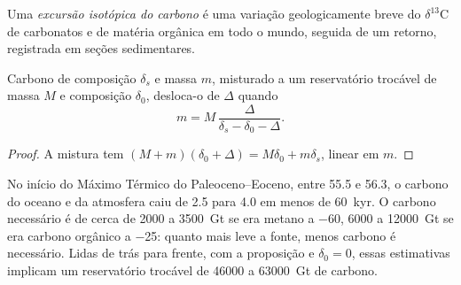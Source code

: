 \begin{definition}\label{def:b3:stable-isotopes:cie}
Uma \emph{excursão isotópica do carbono} é uma
variação geologicamente breve do $\delta^{13}\mathrm C$ de carbonatos e de matéria
orgânica em todo o mundo, seguida de um retorno, registrada em seções sedimentares.
\end{definition}

\begin{proposition}\label{prop:b3:stable-isotopes:cie-mass}
Carbono de composição $\delta_s$ e massa $m$, misturado a um reservatório trocável
de massa $M$ e composição $\delta_0$, desloca-o de $\Delta$ quando
\[
m = M\,\frac{\Delta}{\delta_s - \delta_0 - \Delta}.
\]
\end{proposition}

\begin{proof}
A mistura tem $(M + m)(\delta_0 + \Delta) = M\delta_0 + m\delta_s$, linear em
$m$.
\end{proof}

No início do Máximo Térmico do Paleoceno–Eoceno, entre 55.5 e
\qty{56.3}{\Ma}, o carbono do oceano e da atmosfera caiu de 2.5 para
\qty{4.0}{\permil} em menos de \qty{60}{kyr}. O carbono necessário é de cerca de
2000 a \qty{3500}{Gt} se era metano a \qty{-60}{\permil}, 6000 a
\qty{12000}{Gt} se era carbono orgânico a \qty{-25}{\permil}: quanto mais leve
a fonte, menos carbono é necessário. Lidas de trás para frente, com a proposição
e $\delta_0 = 0$, essas estimativas implicam um reservatório trocável de \num{46000}
a \qty{63000}{Gt} de carbono.


